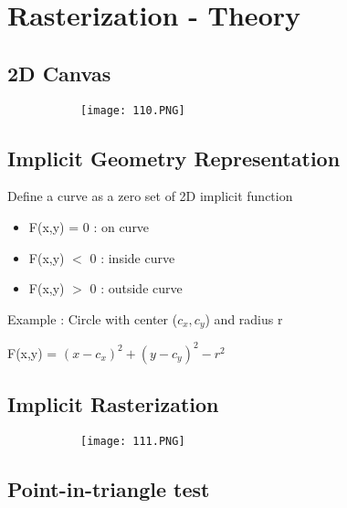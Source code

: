 \documentclass{article}
\begin{document}
\section{Rasterization - Theory}

\subsection{2D Canvas}


\begin{figure}[ht!]
  \centering
  \begin{subfigure}[b]{0.4\linewidth}
    \texttt{[image: 110.PNG]}
  \end{subfigure}
\end{figure}

\subsection{Implicit Geometry Representation}

Define a curve as a zero set of 2D implicit function

\begin{itemize}
    \item F(x,y) = 0 : on curve
    \item F(x,y) $<$ 0 : inside curve
    \item F(x,y) $>$ 0 : outside curve
\end{itemize}

Example : Circle with center ($c_x,c_y$) and radius r 

F(x,y) = $(x-c_x)^2 + (y-c_y)^2 - r^2$

\vspace{30mm}
\subsection{Implicit Rasterization}


\begin{figure}[ht!]
  \centering
  \begin{subfigure}[b]{0.7\linewidth}
    \texttt{[image: 111.PNG]}
  \end{subfigure}
\end{figure}



\subsection{Point-in-triangle test}
\end{document}
